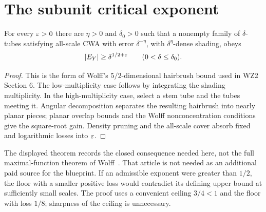 \section{The subunit critical exponent}

\begin{theorem}
\label{thm:hairbrush}
\leanok
{}
For every $\varepsilon>0$ there are $\eta>0$ and $\delta_0>0$ such that
a nonempty family of $\delta$-tubes satisfying all-scale CWA with
error $\delta^{-\eta}$, with $\delta^\eta$-dense shading, obeys
\[
                         |E_Y|\geq\delta^{1/2+\varepsilon}
                         \qquad(0<\delta\leq\delta_0).
\]
\end{theorem}
\begin{proof}
\leanok
This is the form of Wolff's $5/2$-dimensional hairbrush bound used
in WZ2 Section 6. The low-multiplicity case follows by integrating
the shading multiplicity. In the high-multiplicity case, select a
stem tube and the tubes meeting it. Angular decomposition separates
the resulting hairbrush into nearly planar pieces; planar overlap
bounds and the Wolff nonconcentration conditions give the square-root
gain. Density pruning and the all-scale cover absorb fixed and
logarithmic losses into $\varepsilon$.
\end{proof}

\begin{remark}
\label{rem:hairbrush}
The displayed theorem records the closed consequence needed here,
not the full maximal-function theorem of Wolff~\cite{Wolff95}.
That article is not needed as an additional paid source for the
blueprint. If an admissible exponent were greater than $1/2$, the
floor with a smaller positive loss would contradict its defining
upper bound at sufficiently small scales. The proof uses a convenient
ceiling $3/4<1$ and the floor with loss $1/8$; sharpness of the
ceiling is unnecessary.
\end{remark}
